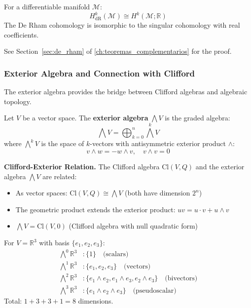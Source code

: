 \begin{theorem}\label{thm:derham}
For a differentiable manifold $\mathcal{M}$:
\[H^k_{\text{dR}}(\mathcal{M}) \cong H^k(\mathcal{M}; \mathbb{R})\]
The De Rham cohomology is isomorphic to the singular cohomology with real coefficients.

See Section~\ref{sec:de_rham} of \autoref{ch:teoremas_complementarios} for the proof.
\end{theorem}

\subsubsection{Exterior Algebra and Connection with Clifford}

The exterior algebra provides the bridge between Clifford algebras and algebraic topology.

\begin{definition}\label{def:algebra_exterior}
Let $V$ be a vector space. The \textbf{exterior algebra} $\bigwedge V$ is the graded algebra:
\[\bigwedge V = \bigoplus_{k=0}^n \bigwedge^k V\]
where $\bigwedge^k V$ is the space of $k$-vectors with antisymmetric exterior product $\wedge$:
\[v \wedge w = -w \wedge v, \quad v \wedge v = 0\]
\end{definition}

\textbf{Clifford-Exterior Relation.}\label{rem:clifford_exterior} The Clifford algebra $\text{Cl}(V, Q)$ and the exterior algebra $\bigwedge V$ are related:
\begin{itemize}
    \item As vector spaces: $\text{Cl}(V,Q) \cong \bigwedge V$ (both have dimension $2^n$)
    \item The geometric product extends the exterior product: $uv = u \cdot v + u \wedge v$
    \item $\bigwedge V = \text{Cl}(V, 0)$ (Clifford algebra with null quadratic form)
\end{itemize}

\begin{example}\label{ex:base_exterior_3d}
For $V = \mathbb{R}^3$ with basis $\{e_1, e_2, e_3\}$:
\begin{align}
\bigwedge^0 \mathbb{R}^3 &: \{1\} \quad \text{(scalars)} \\
\bigwedge^1 \mathbb{R}^3 &: \{e_1, e_2, e_3\} \quad \text{(vectors)} \\
\bigwedge^2 \mathbb{R}^3 &: \{e_1 \wedge e_2, e_1 \wedge e_3, e_2 \wedge e_3\} \quad \text{(bivectors)} \\
\bigwedge^3 \mathbb{R}^3 &: \{e_1 \wedge e_2 \wedge e_3\} \quad \text{(pseudoscalar)}
\end{align}
Total: $1 + 3 + 3 + 1 = 8$ dimensions.
\end{example}

